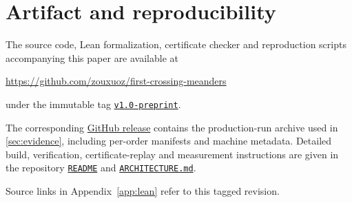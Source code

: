 \clearpage
\section{Artifact and reproducibility}
\label{app:repro}

The source code, Lean formalization, certificate checker and reproduction
scripts accompanying this paper are available at
\begin{center}
\url{https://github.com/zouxuoz/first-crossing-meanders}
\end{center}
under the immutable tag
\href{https://github.com/zouxuoz/first-crossing-meanders/tree/v1.0-preprint}{\texttt{v1.0-preprint}}.

The corresponding
\href{https://github.com/zouxuoz/first-crossing-meanders/releases/tag/v1.0-preprint}{GitHub release}
contains the production-run archive used in \cref{sec:evidence}, including
per-order manifests and machine metadata. Detailed build, verification,
certificate-replay and measurement instructions are given in the repository
\href{https://github.com/zouxuoz/first-crossing-meanders/blob/v1.0-preprint/README.md}{\texttt{README}}
and
\href{https://github.com/zouxuoz/first-crossing-meanders/blob/v1.0-preprint/ARCHITECTURE.md}{\texttt{ARCHITECTURE.md}}.

Source links in Appendix~\ref{app:lean} refer to this tagged revision.
